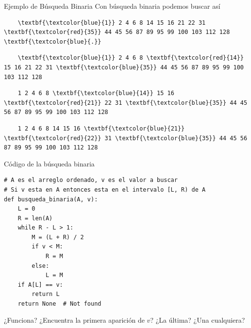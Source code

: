 \documentclass[compress]{beamer}
\begin{document}
\begin{frame}[fragile]{Ejemplo de Búsqueda Binaria}
  Con búsqueda binaria podemos buscar así
  \begin{Verbatim}
    \textbf{\textcolor{blue}{1}} 2 4 6 8 14 15 16 21 22 31 \textbf{\textcolor{red}{35}} 44 45 56 87 89 95 99 100 103 112 128 \textbf{\textcolor{blue}{.}}
  \end{Verbatim}
  \pause
  \begin{Verbatim}
    \textbf{\textcolor{blue}{1}} 2 4 6 8 \textbf{\textcolor{red}{14}} 15 16 21 22 31 \textbf{\textcolor{blue}{35}} 44 45 56 87 89 95 99 100 103 112 128
  \end{Verbatim}
  \pause
  \begin{Verbatim}
    1 2 4 6 8 \textbf{\textcolor{blue}{14}} 15 16 \textbf{\textcolor{red}{21}} 22 31 \textbf{\textcolor{blue}{35}} 44 45 56 87 89 95 99 100 103 112 128
  \end{Verbatim}
  \pause
  \begin{Verbatim}
    1 2 4 6 8 14 15 16 \textbf{\textcolor{blue}{21}} \textbf{\textcolor{red}{22}} 31 \textbf{\textcolor{blue}{35}} 44 45 56 87 89 95 99 100 103 112 128
  \end{Verbatim}
  \pause
\end{frame}

\begin{frame}[fragile]{Código de la búsqueda binaria}
\begin{lstlisting}
# A es el arreglo ordenado, v es el valor a buscar
# Si v esta en A entonces esta en el intervalo [L, R) de A
def busqueda_binaria(A, v):
    L = 0
    R = len(A)
    while R - L > 1:
        M = (L + R) / 2
        if v < M:
            R = M
        else:
            L = M
    if A[L] == v:
        return L
    return None  # Not found
\end{lstlisting}
¿Funciona? ¿Encuentra la primera aparición de $v$? ¿La última? ¿Una cualquiera?


\end{frame}
\end{document}
